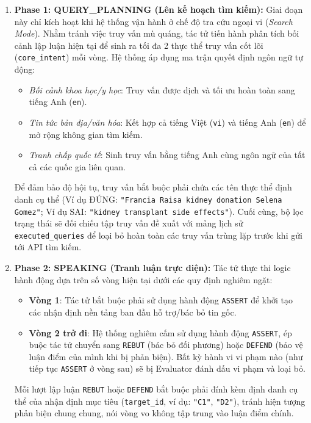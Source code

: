 \documentclass[12pt,a4paper]{report}
\begin{document}
\begin{enumerate}
    \item \textbf{Phase 1: QUERY\_PLANNING (Lên kế hoạch tìm kiếm):}
    Giai đoạn này chỉ kích hoạt khi hệ thống vận hành ở chế độ tra cứu ngoại vi (\textit{Search Mode}). Nhằm tránh việc truy vấn mù quáng, tác tử tiến hành phân tích bối cảnh lập luận hiện tại để sinh ra tối đa 2 thực thể truy vấn cốt lõi (\texttt{core\_intent}) mỗi vòng. Hệ thống áp dụng ma trận quyết định ngôn ngữ tự động:
    \begin{itemize}
        \item \textit{Bối cảnh khoa học/y học}: Truy vấn được dịch và tối ưu hoàn toàn sang tiếng Anh (\texttt{en}).
        \item \textit{Tin tức bản địa/văn hóa}: Kết hợp cả tiếng Việt (\texttt{vi}) và tiếng Anh (\texttt{en}) để mở rộng không gian tìm kiếm.
        \item \textit{Tranh chấp quốc tế}: Sinh truy vấn bằng tiếng Anh cùng ngôn ngữ của tất cả các quốc gia liên quan.
    \end{itemize}
    Để đảm bảo độ hội tụ, truy vấn bắt buộc phải chứa các tên thực thể định danh cụ thể (Ví dụ ĐÚNG: \texttt{"Francia Raisa kidney donation Selena Gomez"}; Ví dụ SAI: \texttt{"kidney transplant side effects"}). Cuối cùng, bộ lọc trạng thái sẽ đối chiếu tập truy vấn đề xuất với mảng lịch sử \texttt{executed\_queries} để loại bỏ hoàn toàn các truy vấn trùng lặp trước khi gửi tới API tìm kiếm.
    
    \item \textbf{Phase 2: SPEAKING (Tranh luận trực diện):}
    Tác tử thực thi logic hành động dựa trên số vòng hiện tại dưới các quy định nghiêm ngặt:
    \begin{itemize}
        \item \textbf{Vòng 1}: Tác tử bắt buộc phải sử dụng hành động \texttt{ASSERT} để khởi tạo các nhận định nền tảng ban đầu hỗ trợ/bác bỏ tin gốc.
        \item \textbf{Vòng 2 trở đi}: Hệ thống nghiêm cấm sử dụng hành động \texttt{ASSERT}, ép buộc tác tử chuyển sang \texttt{REBUT} (bác bỏ đối phương) hoặc \texttt{DEFEND} (bảo vệ luận điểm của mình khi bị phản biện). Bất kỳ hành vi vi phạm nào (như tiếp tục \texttt{ASSERT} ở vòng sau) sẽ bị Evaluator đánh dấu vi phạm và loại bỏ.
    \end{itemize}
    Mỗi lượt lập luận \texttt{REBUT} hoặc \texttt{DEFEND} bắt buộc phải đính kèm định danh cụ thể của nhận định mục tiêu (\texttt{target\_id}, ví dụ: \texttt{"C1"}, \texttt{"D2"}), tránh hiện tượng phản biện chung chung, nói vòng vo không tập trung vào luận điểm chính.
\end{enumerate}
\end{document}
